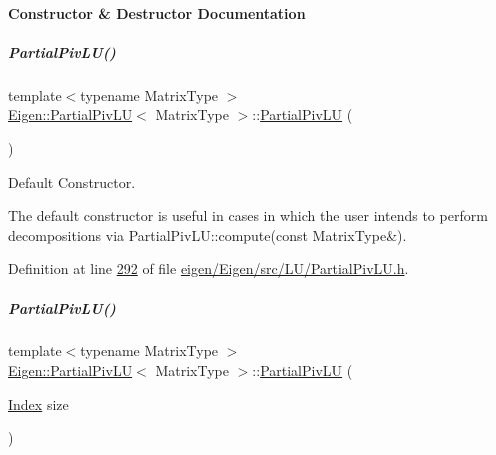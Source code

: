 \paragraph{Constructor \& Destructor Documentation}
\mbox{\label{group___l_u___module_a5c04818d354f94a98786d8a44cb709c6}} 
\subparagraph{\texorpdfstring{Partial\+Piv\+L\+U()}{PartialPivLU()}\hspace{0.1cm}{\footnotesize\ttfamily [1/8]}}
{\footnotesize\ttfamily template$<$typename Matrix\+Type $>$ \\
\hyperlink{group___l_u___module_class_eigen_1_1_partial_piv_l_u}{Eigen\+::\+Partial\+Piv\+LU}$<$ Matrix\+Type $>$\+::\hyperlink{group___l_u___module_class_eigen_1_1_partial_piv_l_u}{Partial\+Piv\+LU} (\begin{DoxyParamCaption}{ }\end{DoxyParamCaption})}



Default Constructor. 

The default constructor is useful in cases in which the user intends to perform decompositions via Partial\+Piv\+L\+U\+::compute(const Matrix\+Type\&). 

Definition at line \hyperlink{eigen_2_eigen_2src_2_l_u_2_partial_piv_l_u_8h_source_l00292}{292} of file \hyperlink{eigen_2_eigen_2src_2_l_u_2_partial_piv_l_u_8h_source}{eigen/\+Eigen/src/\+L\+U/\+Partial\+Piv\+L\+U.\+h}.

\mbox{\label{group___l_u___module_acf892c12d8a229b32bddc3149e32e63a}} 
\subparagraph{\texorpdfstring{Partial\+Piv\+L\+U()}{PartialPivLU()}\hspace{0.1cm}{\footnotesize\ttfamily [2/8]}}
{\footnotesize\ttfamily template$<$typename Matrix\+Type $>$ \\
\hyperlink{group___l_u___module_class_eigen_1_1_partial_piv_l_u}{Eigen\+::\+Partial\+Piv\+LU}$<$ Matrix\+Type $>$\+::\hyperlink{group___l_u___module_class_eigen_1_1_partial_piv_l_u}{Partial\+Piv\+LU} (\begin{DoxyParamCaption}\item[{\hyperlink{group___core___module_a554f30542cc2316add4b1ea0a492ff02}{Index}}]{size }\end{DoxyParamCaption})\hspace{0.3cm}{\ttfamily [explicit]}}



